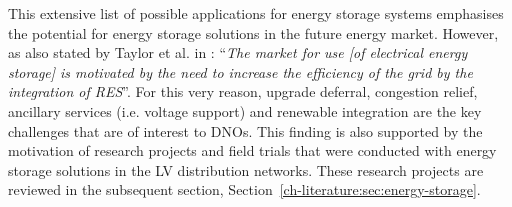 This extensive list of possible applications for energy storage systems emphasises the potential for energy storage solutions in the future energy market.
However, as also stated by Taylor et al. in \cite{Taylor2016}: ``\textit{The market for use [of electrical energy storage] is motivated by the need to increase the efficiency of the grid by the integration of RES}''.
For this very reason, upgrade deferral, congestion relief, ancillary services (i.e. voltage support) and renewable integration are the key challenges that are of interest to DNOs.
This finding is also supported by the motivation of research projects and field trials that were conducted with energy storage solutions in the LV distribution networks.
These research projects are reviewed in the subsequent section, Section~\ref{ch-literature:sec:energy-storage}.








